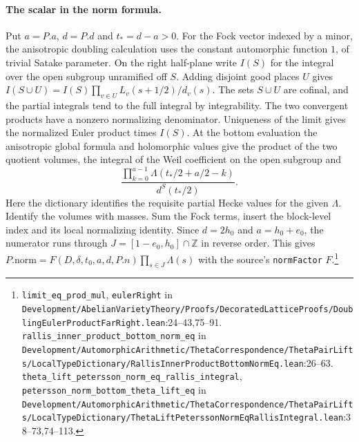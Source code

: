 \paragraph{The scalar in the norm formula.}
Put $a=P.a$, $d=P.d$ and $t_*=d-a>0$. For the Fock vector indexed by a minor, the anisotropic doubling calculation uses the constant automorphic function $1$, of trivial Satake parameter. On the right half-plane write $I(S)$ for the integral over the open subgroup unramified off $S$. Adding disjoint good places $U$ gives $I(S\cup U)=I(S)\prod_{v\in U}L_v(s+1/2)/d_v(s)$. The sets $S\cup U$ are cofinal, and the partial integrals tend to the full integral by integrability. The two convergent products have a nonzero normalizing denominator. Uniqueness of the limit gives the normalized Euler product times $I(S)$. At the bottom evaluation the anisotropic global formula and holomorphic values give the product of the two quotient volumes, the integral of the Weil coefficient on the open subgroup and
\[
 \frac{\prod_{k=0}^{a-1}\Lambda(t_*/2+a/2-k)}
 {d^S(t_*/2)}.
\]
Here the dictionary identifies the requisite partial Hecke values for the given $\Lambda$. Identify the volumes with masses. Sum the Fock terms, insert the block-level index and its local normalizing identity. Since $d=2h_0$ and $a=h_0+e_0$, the numerator runs through $J=[1-e_0,h_0]\cap\mathbb Z$ in reverse order. This gives $P.\mathrm{norm}=F(D,\delta,t_0,a,d,P.n)\prod_{s\in J}\Lambda(s)$ with the source's \nolinkurl{normFactor} $F$.\footnote{\nolinkurl{limit_eq_prod_mul}, \nolinkurl{eulerRight} in \nolinkurl{Development/AbelianVarietyTheory/Proofs/DecoratedLatticeProofs/DoublingEulerProductFarRight.lean}\allowbreak:24--43,75--91. \nolinkurl{rallis_inner_product_bottom_norm_eq} in \nolinkurl{Development/AutomorphicArithmetic/ThetaCorrespondence/ThetaPairLifts/LocalTypeDictionary/RallisInnerProductBottomNormEq.lean}\allowbreak:26--63. \nolinkurl{theta_lift_petersson_norm_eq_rallis_integral}, \nolinkurl{petersson_norm_bottom_theta_lift_eq} in \nolinkurl{Development/AutomorphicArithmetic/ThetaCorrespondence/ThetaPairLifts/LocalTypeDictionary/ThetaLiftPeterssonNormEqRallisIntegral.lean}\allowbreak:38--73,74--113.}

